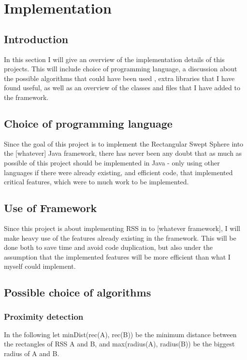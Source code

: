 
\section{Implementation}
\label{implementation}

\subsection{Introduction}
In this section I will give an overview of the implementation details of this projects. This will include choice of programming language, a discussion about the possible algorithms that could have been used , extra libraries that I have found useful, as well as an overview of the classes and files that I have added to the framework.

\subsection{Choice of programming language}
Since the goal of this project is to implement the Rectangular Swept Sphere into the [whatever]  Java framework, there has never been any doubt that as much as possible of this project should be implemented in Java - only using other languages if there were already existing, and efficient code, that implemented critical features, which were to much work to be implemented.

\subsection{Use of Framework}
Since this project is about implementing RSS in to [whatever framework], I will make heavy use of the features already existing in the framework. This will be done both to save time and avoid code duplication, but also under the assumption that the implemented features will be more efficient than what I myself could implement.

\subsection{Possible choice of algorithms}
\subsubsection{Proximity detection}
In the following let minDist(rec(A), rec(B)) be the minimum distance between the rectangles of RSS A and B, and max(radius(A), radius(B)) be the biggest radius of A and B.\\

